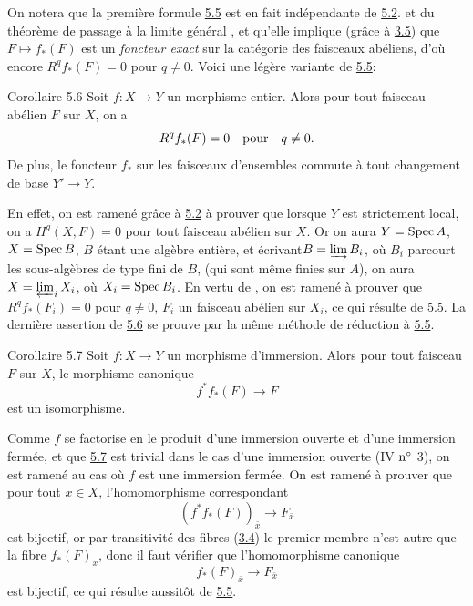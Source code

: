 \documentclass[10pt]{../fichiers-configuration-latex/smfart}
\begin{document}
On notera que la première formule \hyperref[VIII.prop5.5]{5.5} est en fait
indépendante de \hyperref[VIII.thm5.2]{5.2}. et du théorème de passage à la
limite général , et qu'elle implique (grâce à
\hyperref[VIII.thm3.5]{3.5}) que $F \mapsto f_{\ast} (F)$ est un
\emph{foncteur exact} sur la catégorie des faisceaux abéliens, d'où
encore $R^q f_{\ast} (F) = 0$ pour $q \neq 0$. Voici une légère
variante de \hyperref[VIII.prop5.5]{5.5}:

\begin{enonce*}{Corollaire 5.6}
Soit $f : X \to Y$ un morphisme entier. Alors pour tout faisceau
abélien $F$ sur $X$, on a
$$
R^q f_{\ast} (F) = 0\quad \mbox{pour}\quad q \neq 0{}.
$$
De plus, le foncteur $f_{\ast}$ sur les faisceaux d'ensembles commute
à tout changement de base $Y'\to Y$.
\end{enonce*}

En effet, on est ramené grâce à \hyperref[VIII.thm5.2]{5.2} à prouver que lorsque $Y$ est
strictement local, on a $H^q(X, F) = 0$ pour tout faisceau abélien sur
$X$. Or on aura $Y = \operatorname{Spec} A$, $X = \operatorname{Spec} B$, $B$ étant une algèbre
entière, et écrivant\pageoriginale $B = \varinjlim B_i$, où
$B_i$ parcourt les
sous-algèbres de type fini de $B$, (qui sont même finies sur $A$), on
aura $X = \varprojlim_{i} X_i$, où $X_i = \operatorname{Spec} B_i$. En vertu
de , on est ramené à prouver que $R^{q} f_{\ast} (F_i) = 0$
pour $q \neq 0$, $F_i$ un faisceau abélien sur $X_i$, ce qui résulte
de \hyperref[VIII.prop5.5]{5.5}. La dernière assertion de \hyperref[VIII.cor5.6]{5.6} se
prouve par la même méthode de
réduction à \hyperref[VIII.prop5.5]{5.5}.

\begin{enonce*}{Corollaire 5.7}
Soit $f : X \to Y$ un morphisme d'immersion. Alors pour tout faisceau
$F$ sur $X$, le morphisme canonique
$$
f^{\ast} f_{\ast} (F) \to F
$$
est un isomorphisme.
\end{enonce*}

Comme $f$ se factorise en le produit d'une immersion ouverte et
d'une immersion fermée, et que \hyperref[VIII.cor5.7]{5.7} est trivial dans le
cas d'une immersion ouverte (IV ${\rm n^{\circ}}$ 3), on est ramené
au cas où $f$ est une immersion fermée. On est ramené à prouver que
pour tout $x \in X$, l'homomorphisme correspondant
$$
(f^{\ast} f_{\ast}(F))_{\bar{x}} \to F_{\bar{x}}
$$
est bijectif, or par transitivité des fibres (\hyperref[VIII.subsec3.4]{3.4})
le premier membre
n'est autre que la fibre $f_{\ast} (F)_{\bar{x}}$, donc il faut
vérifier que l'homomorphisme canonique
$$
f_{\ast} (F)_{\bar{x}} \to F_{\bar{x}}
$$
est bijectif, ce qui résulte aussitôt de \hyperref[VIII.prop5.5]{5.5}.
\end{document}
